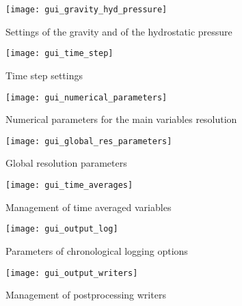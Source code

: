 {{\begin{figure}[!ht]
\begin{center}
\texttt{[image: gui\_gravity\_hyd\_pressure]}
\caption{Settings of the gravity and of the hydrostatic pressure}
\label{fig:15_GUI}
\end{center}
\end{figure}

\begin{figure}[!ht]
\begin{center}
\texttt{[image: gui\_time\_step]}
\caption{Time step settings}
\label{fig:21_GUI}
\end{center}
\end{figure}

\begin{figure}[!ht]
\begin{center}
\texttt{[image: gui\_numerical\_parameters]}
\caption{Numerical parameters for the main variables resolution}
\label{fig:22_GUI}
\end{center}
\end{figure}

\begin{figure}[!ht]
\begin{center}
\texttt{[image: gui\_global\_res\_parameters]}
\caption{Global resolution parameters}
\label{fig:23_GUI}
\end{center}
\end{figure}

\begin{figure}[!ht]
\begin{center}
\texttt{[image: gui\_time\_averages]}
\caption{Management of time averaged variables}
\label{fig:24_GUI}
\end{center}
\end{figure}

\begin{figure}[!ht]
\begin{center}
\texttt{[image: gui\_output\_log]}
\caption{Parameters of chronological logging options}
\label{gui_output_log}
\end{center}
\end{figure}

\begin{figure}[!ht]
\begin{center}
\texttt{[image: gui\_output\_writers]}
\caption{Management of postprocessing writers}
\label{gui_output_writers}
\end{center}
\end{figure}

}}
